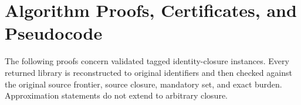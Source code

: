 \section{Algorithm Proofs, Certificates, and Pseudocode}
\label{sec:or-algorithm-proofs}

The following proofs concern validated tagged identity-closure instances.
Every returned library is reconstructed to original identifiers and then
checked against the original source frontier, source closure, mandatory set,
and exact burden. Approximation statements do not extend to arbitrary closure.




